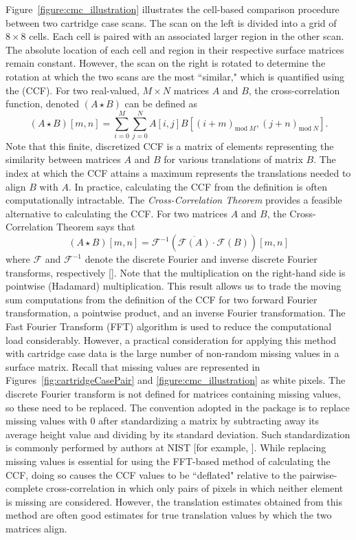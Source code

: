 Figure~\ref{figure:cmc_illustration} illustrates the cell-based comparison procedure between two cartridge case scans. The scan on the left is divided into a grid of $8 \times 8$ cells. Each cell is paired with an associated larger region in the other scan. The absolute location of each cell and region in their respective surface matrices remain constant. However, the scan on the right is rotated to determine the rotation at which the two scans are the most ``similar," which is quantified using the  (CCF). For two real-valued, $M \times N$ matrices $A$ and $B$, the cross-correlation function, denoted $(A \star B)$ can be defined as
$$
(A \star B)[m,n] = \sum_{i=0}^M \sum_{j=0}^N A[i,j] B[(i + m)_{\text{mod}\ M}, (j + n)_{\text{mod}\ N}].
$$
Note that this finite, discretized CCF is a matrix of elements representing the similarity between matrices $A$ and $B$ for various translations of matrix $B$. The index at which the CCF attains a maximum represents the translations needed to align $B$ with $A$. In practice, calculating the CCF from the definition is often computationally intractable. The \emph{Cross-Correlation Theorem} provides a feasible alternative to calculating the CCF. For two matrices $A$ and $B$, the Cross-Correlation Theorem says that
$$
(A \star B )[m,n]= \mathcal{F}^{-1}\left(\overline{\mathcal{F}(A)} \cdot \mathcal{F}(B)\right)[m,n]
$$
where $\mathcal{F}$ and $\mathcal{F}^{-1}$ denote the discrete Fourier and inverse discrete Fourier transforms, respectively [\citet{fft_brigham}]. Note that the multiplication on the right-hand side is pointwise (Hadamard) multiplication. This result allows us to trade the moving sum computations from the definition of the CCF for two forward Fourier transformation, a pointwise product, and an inverse Fourier transformation. The Fast Fourier Transform (FFT) algorithm is used to reduce the computational load considerably. However, a practical consideration for applying this method with cartridge case data is the large number of non-random missing values in a surface matrix. Recall that missing values are represented in Figures~\ref{fig:cartridgeCasePair} and \ref{figure:cmc_illustration} as white pixels. The discrete Fourier transform is not defined for matrices containing missing values, so these need to be replaced. The convention adopted in the  package is to replace missing values with 0 after standardizing a matrix by subtracting away its average height value and dividing by its standard deviation. Such standardization is commonly performed by authors at NIST [for example, \citet{ott_applying_2017}]. While replacing missing values is essential for using the FFT-based method of calculating the CCF, doing so causes the CCF values to be ``deflated" relative to the pairwise-complete cross-correlation in which only pairs of pixels in which neither element is missing are considered. However, the translation estimates obtained from this method are often good estimates for true translation values by which the two matrices align.

